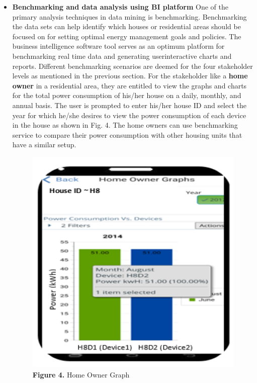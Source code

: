 \documentclass[a4paper,12pt,oneside]{article}
\let\counterwithin\relax
\begin{document}
\begin{itemize}
    \item \textbf{Benchmarking and data analysis using BI platform}
    \newline
    One of the primary analysis techniques in data mining is
    benchmarking. Benchmarking the data sets can help identify which houses or residential areas should be focused on for
    setting optimal energy management goals and policies. The
    business intelligence software tool serves as an optimum
    platform for benchmarking real time data and generating userinteractive
    charts and reports. Different benchmarking
    scenarios are deemed for the four stakeholder levels as
    mentioned in the previous section. 
    \newpage
    For the stakeholder like a \textbf{home owner} in a residential area, they are entitled to view the
    graphs and charts for the total power consumption of his/her
    house on a daily, monthly, and annual basis. The user is
    prompted to enter his/her house ID and select the year for
    which he/she desires to view the power consumption of each
    device in the house as shown in Fig. 4. The home owners can
    use benchmarking service to compare their power
    consumption with other housing units that have a similar
    setup.
    \newline
        \begin{figure}[H]
        \includegraphics{Figure4.png}
        \centering
        \caption[Home Owner Graph]{\textbf{Figure 4.} Home Owner Graph}

\end{figure}
\end{itemize}
\end{document}
